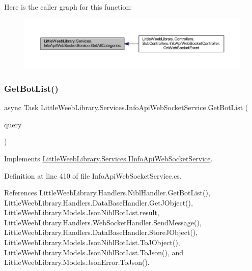 Here is the caller graph for this function\+:\nopagebreak
\begin{figure}[H]
\begin{center}
\leavevmode
\includegraphics[width=350pt]{class_little_weeb_library_1_1_services_1_1_info_api_web_socket_service_a310f91aba5d17d8202aea81442da2545_icgraph}
\end{center}
\end{figure}
\mbox{\label{class_little_weeb_library_1_1_services_1_1_info_api_web_socket_service_a5f91364bc403db5d521f15881a385143}} 
\subsubsection{\texorpdfstring{Get\+Bot\+List()}{GetBotList()}}
{\footnotesize\ttfamily async Task Little\+Weeb\+Library.\+Services.\+Info\+Api\+Web\+Socket\+Service.\+Get\+Bot\+List (\begin{DoxyParamCaption}\item[{J\+Object}]{query }\end{DoxyParamCaption})}



Implements \mbox{\hyperlink{interface_little_weeb_library_1_1_services_1_1_i_info_api_web_socket_service_acee715ffd1c39bcef083983a15ebe782}{Little\+Weeb\+Library.\+Services.\+I\+Info\+Api\+Web\+Socket\+Service}}.



Definition at line 410 of file Info\+Api\+Web\+Socket\+Service.\+cs.



References Little\+Weeb\+Library.\+Handlers.\+Nibl\+Handler.\+Get\+Bot\+List(), Little\+Weeb\+Library.\+Handlers.\+Data\+Base\+Handler.\+Get\+J\+Object(), Little\+Weeb\+Library.\+Models.\+Json\+Nibl\+Bot\+List.\+result, Little\+Weeb\+Library.\+Handlers.\+Web\+Socket\+Handler.\+Send\+Message(), Little\+Weeb\+Library.\+Handlers.\+Data\+Base\+Handler.\+Store\+J\+Object(), Little\+Weeb\+Library.\+Models.\+Json\+Nibl\+Bot\+List.\+To\+J\+Object(), Little\+Weeb\+Library.\+Models.\+Json\+Nibl\+Bot\+List.\+To\+Json(), and Little\+Weeb\+Library.\+Models.\+Json\+Error.\+To\+Json().



